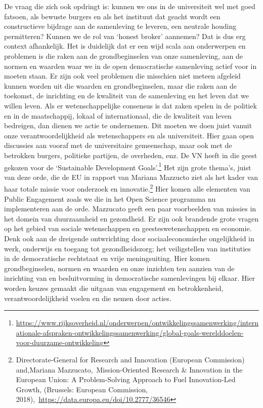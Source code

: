 \documentclass[empirical, authordate, ]{new-jote-article}
\begin{document}
	De vraag die zich ook opdringt is: kunnen we ons in de universiteit wel met goed fatsoen, als bewuste burgers en als het instituut dat geacht wordt een constructieve bijdrage aan de samenleving te leveren, een neutrale houding permitteren? Kunnen we de rol van ‘honest broker' aannemen? Dat is dus erg context afhankelijk. Het is duidelijk dat er een wijd scala aan onderwerpen en problemen is die raken aan de grondbeginselen van onze samenleving, aan de normen en waarden waar we in de open democratische samenleving actief voor in moeten staan. Er zijn ook veel problemen die misschien niet meteen afgeleid kunnen worden uit die waarden en grondbeginselen, maar die raken aan de toekomst, de inrichting en de kwaliteit van de samenleving en het leven dat we willen leven. Als er wetenschappelijke consensus is dat zaken spelen in de politiek en in de maatschappij, lokaal of internationaal, die de kwaliteit van leven bedreigen, dan dienen we actie te ondernemen. Dit moeten we doen juist vanuit onze verantwoordelijkheid als wetenschappers en als universiteit. Hier gaan open discussies aan vooraf met de universitaire gemeenschap, maar ook met de betrokken burgers, politieke partijen, de overheden, enz. De VN heeft in die geest gekozen voor de ‘Sustainable Development Goals'.\footnote{\href{about:blank}{https://www.rijksoverheid.nl/onderwerpen/ontwikkelingssamenwerking/internationale-afspraken-ontwikkelingssamenwerking/global-goals-werelddoelen-voor-duurzame-ontwikkeling}} Het zijn grote thema's, juist van deze orde, die de EU in rapport van Mariana Mazzucto ziet als het kader van haar totale missie voor onderzoek en innovatie.\footnote{Directorate-General for Research and Innovation (European Commission) and,Mariana Mazzucato, Mission-Oriented Research \& Innovation in the European Union: A Problem-Solving Approach to Fuel Innovation-Led Growth, (Brussels: European Commission, 2018), \href{about:blank}{https://data.europa.eu/doi/10.2777/36546}} Hier komen alle elementen van Public Engagement zoals we die in het Open Science programma nu implementeren aan de orde. Mazzucato geeft een paar voorbeelden van missies in het domein van duurzaamheid en gezondheid. Er zijn ook brandende grote vragen op het gebied van sociale wetenschappen en geesteswetenschappen en economie. Denk ook aan de dreigende ontwrichting door sociaaleconomische ongelijkheid in werk, onderwijs en toegang tot gezondheidszorg; het veiligstellen van instituties in de democratische rechtstaat en vrije meningsuiting. Hier komen grondbeginselen, normen en waarden en onze inzichten ten aanzien van de inrichting van en besluitvorming in democratische samenlevingen bij elkaar. Hier worden keuzes gemaakt die uitgaan van engagement en betrokkenheid, verantwoordelijkheid voelen en die nemen door acties.
\end{document}
